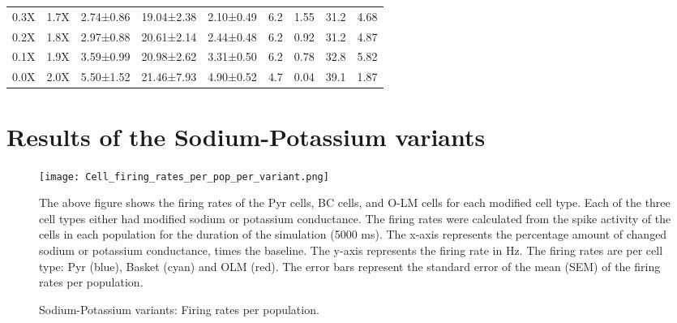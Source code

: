 \begin{table}[htbp]
\begin{adjustbox}{width=\textwidth}
\begin{tabular}{ccccccccc}
            0.3X       & 1.7X        & 2.74±0.86                     & 19.04±2.38 & 2.10±0.49 & 6.2 & 1.55 & 31.2 & 4.68 \\
            0.2X       & 1.8X        & 2.97±0.88                     & 20.61±2.14 & 2.44±0.48 & 6.2 & 0.92 & 31.2 & 4.87 \\
            0.1X       & 1.9X        & 3.59±0.99                     & 20.98±2.62 & 3.31±0.50 & 6.2 & 0.78 & 32.8 & 5.82 \\
            0.0X       & 2.0X        & 5.50±1.52                     & 21.46±7.93 & 4.90±0.52 & 4.7 & 0.04 & 39.1 & 1.87 \\
            \hline
        \end{tabular}
    \end{adjustbox}
\end{table}
\pagebreak
\section{Results of the Sodium-Potassium variants}



\begin{figure}[htbp]
    \centering
    \texttt{[image: Cell\_firing\_rates\_per\_pop\_per\_variant.png]}
    \caption[Sodium-Potassium variants: Firing rates per population]{Sodium-Potassium variants: Firing rates per population.}\label{fig:sodium_potassium_firing_rates}
    \begin{minipage}{0.9\textwidth}
        The above figure shows the firing rates of the Pyr cells, BC cells, and O-LM cells for each modified cell type.
        Each of the three cell types either had modified sodium or potassium conductance.
        The firing rates were calculated from the spike activity of the cells in each population for the duration of the simulation (5000 ms).
        The x-axis represents the percentage amount of changed sodium or potassium conductance, times the baseline.
        The y-axis represents the firing rate in Hz.
        The firing rates are per cell type: Pyr (blue), Basket (cyan) and OLM (red).
        The error bars represent the standard error of the mean (SEM) of the firing rates per population.
    \end{minipage}
\end{figure}

